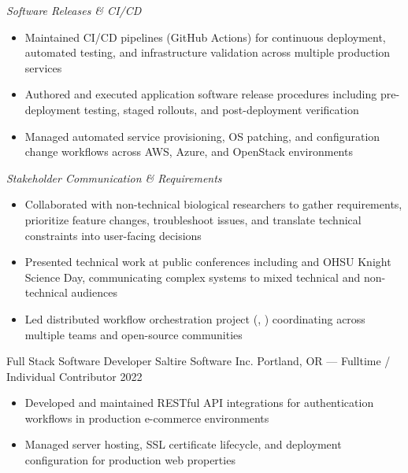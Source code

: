 \vspace{1em}

\emph{Software Releases \& CI/CD}

\begin{itemize}
    \item Maintained CI/CD pipelines (GitHub Actions) for continuous deployment, automated testing, and infrastructure validation across multiple production services
    \item Authored and executed application software release procedures including pre-deployment testing, staged rollouts, and post-deployment verification
    \item Managed automated service provisioning, OS patching, and configuration change workflows across AWS, Azure, and OpenStack environments
\end{itemize}

\vspace{1em}

\emph{Stakeholder Communication \& Requirements}

\begin{itemize}
    \item Collaborated with non-technical biological researchers to gather requirements, prioritize feature changes, troubleshoot issues, and translate technical constraints into user-facing decisions
    \item Presented technical work at public conferences including  and OHSU Knight Science Day, communicating complex systems to mixed technical and non-technical audiences
    \item Led distributed workflow orchestration project (, ) coordinating across multiple teams and open-source communities
\end{itemize}

\showoff
{Full Stack Software Developer}
{Saltire Software Inc.}
{Portland, OR --- Fulltime / Individual Contributor}
{2022}

\begin{itemize}
    \item Developed and maintained RESTful API integrations for authentication workflows in production e-commerce environments
    \item Managed server hosting, SSL certificate lifecycle, and deployment configuration for production web properties
\end{itemize}

